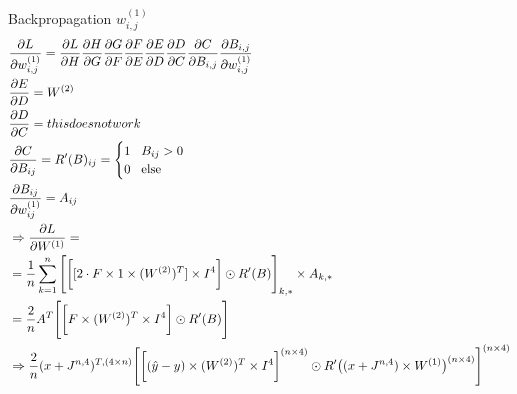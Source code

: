 \begin{exercise}[Backpropagate]
Backpropagation $w^{(1)}_{i,j}$
\begin{align*}
& \frac{\partial L}{\partial w^{(1)}_{i,j}} = \frac{\partial L}{\partial H} \frac{\partial H}{\partial G} \frac{\partial G}{\partial F} \frac{\partial F}{\partial E} \frac{\partial E}{\partial D} \frac{\partial D}{\partial C} \frac{\partial C}{\partial B_{i,j}} \frac{\partial B_{i,j}}{\partial w^{(1)}_{i,j}} \\
& \frac{\partial E}{\partial D} = W^{(2)} \\
& \frac{\partial D}{\partial C} = this does not work \\
& \frac{\partial C}{\partial B_{ij}} = R'(B)_{ij} = \begin{cases}
    1 \hspace{0.3cm} B_{ij} > 0\\ %
    0 \hspace{0.3cm} \text{else} \\
\end{cases} \\
& \frac{\partial B_{ij}}{\partial w^{(1)}_{ij}} = A_{ij} \\
& \Rightarrow \frac{\partial L}{\partial W^{(1)}} = \\
& = \frac{1}{n} \sum_{k=1}^n \Bigg[ \bigg[  [ 2 \cdot F \times 1 \times (W^{(2)})^T] \times I^4\bigg] \odot R'(B) \Bigg]_{k,*} \times A_{k,*} \\
& = \frac{2}{n} A^T \Bigg[ \bigg[ F \times (W^{(2)})^T \times I^4\bigg] \odot R'(B) \Bigg] \\
& \Rightarrow \frac{2}{n} (x + J^{n,4})^{T, (4\times n)} \Bigg[ \bigg[ (\hat{y} - y) \times (W^{(2)})^T \times I^4\bigg]^{(n\times 4)} \odot R'\big((x+J^{n,4}) \times W^{(1)}\big)^{(n\times 4)} \Bigg]^{(n\times 4)}
\end{align*}
\endgroup


\end{exercise}
